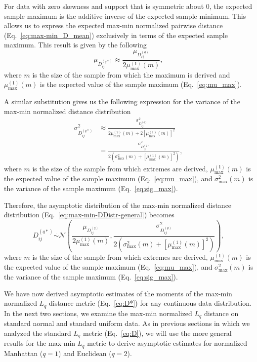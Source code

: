 \documentclass[10pt,letterpaper]{article}
\begin{document}
For data with zero skewness and support that is symmetric about 0, the expected sample maximum is the additive inverse of the expected sample minimum. This allows us to express the expected max-min normalized pairwise distance (Eq.~\ref{eq:max-min_D_mean}) exclusively in terms of the expected sample maximum. This result is given by the following
%
\begin{equation}\label{eq:max-min_D_mean_symm}
\mu_{D^{(q*)}_{ij}} \approx \frac{\mu_{D^{(q)}_{ij}}}{2\mu^{(1)}_\text{max}(m)},
\end{equation}
%
where $m$ is the size of the sample from which the maximum is derived and $\mu^{(1)}_\text{max}(m)$ is the expected value of the sample maximum (Eq.~\ref{eq:mu_max}).

A similar substitution gives us the following expression for the variance of the max-min normalized distance distribution
%
\begin{equation}\label{eq:max-min_D_var_symm}
\begin{aligned}
\sigma^2_{D^{(q*)}_{ij}} &\approx \frac{\sigma^2_{D^{(q)}_{ij}}}{2\mu^{(2)}_\text{max}(m) + 2\left[\mu^{(1)}_\text{max}(m)\right]^2} \\
&= \frac{\sigma^2_{D^{(q)}_{ij}}}{2\left(\sigma^2_\text{max}(m) + \left[\mu^{(1)}_\text{max}(m)\right]^2\right)},
\end{aligned}
\end{equation}
%
where $m$ is the size of the sample from which extremes are derived, $\mu^{(1)}_\text{max}(m)$ is the expected value of the sample maximum (Eq.~\ref{eq:mu_max}), and $\sigma^2_\text{max}(m)$ is the variance of the sample maximum (Eq.~\ref{eq:sig_max}).

Therefore, the asymptotic distribution of the max-min normalized distance distribution (Eq.~\ref{eq:max-min-DDistr-general}) becomes
%
\begin{equation}\label{eq:max-min_DDistr}
D^{(q*)}_{ij} \overset{.}{\sim} \mathcal{N}\left(\frac{\mu_{D^{(q)}_{ij}}}{2\mu^{(1)}_\text{max}(m)}, \frac{\sigma^2_{D^{(q)}_{ij}}}{2\left(\sigma^2_\text{max}(m) + \left[\mu^{(1)}_\text{max}(m)\right]^2\right)}\right),
\end{equation}
%
where $m$ is the size of the sample from which extremes are derived, $\mu^{(1)}_\text{max}(m)$ is the expected value of the sample maximum (Eq.~\ref{eq:mu_max}), and $\sigma^2_\text{max}(m)$ is the variance of the sample maximum (Eq.~\ref{eq:sig_max}). 

We have now derived asymptotic estimates of the moments of the max-min normalized $L_q$ distance metric (Eq.~\ref{eq:D*}) for any continuous data distribution. In the next two sections, we examine the max-min normalized $L_q$ distance on standard normal and standard uniform data. As in previous sections in which we analyzed the standard $L_q$ metric (Eq.~\ref{eq:D}), we will use the more general results for the max-min $L_q$ metric to derive asymptotic estimates for normalized Manhattan ($q=1$) and Euclidean ($q=2$).
\end{document}
